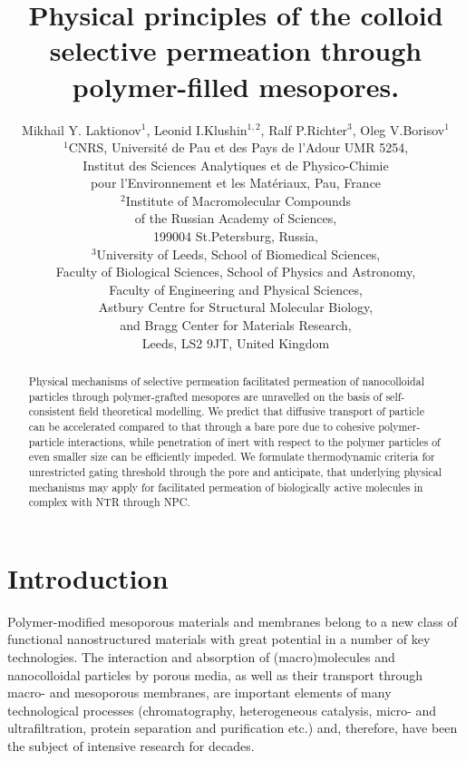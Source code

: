 \documentclass[12pt, a4paper]{article}
\title{Physical principles of the colloid selective permeation through polymer-filled mesopores.}
\author{Mikhail Y. Laktionov$^1$, Leonid I.Klushin$^{1,2}$, Ralf P.Richter$^3$, Oleg V.Borisov$^1$\\
$^{1}$CNRS, Universit\'e de Pau et des Pays de l'Adour UMR 5254,\\
Institut des Sciences Analytiques et de Physico-Chimie\\
pour l'Environnement et les Mat\'eriaux, Pau, France \\
$^{2}$Institute of Macromolecular Compounds \\
of the Russian Academy of Sciences, \\
199004 St.Petersburg, Russia,\\
$^{3}$University of Leeds, School of Biomedical Sciences, \\
Faculty of Biological Sciences, 
School of Physics and Astronomy, \\
Faculty of Engineering and Physical Sciences,\\  
Astbury Centre for Structural Molecular Biology,\\ 
and Bragg Center for Materials Research,\\ 
Leeds, LS2 9JT, United Kingdom}
\begin{document}
\maketitle

\begin{abstract}
Physical mechanisms of selective permeation facilitated permeation of nanocolloidal particles 
through polymer-grafted mesopores are unravelled on the basis of self-consistent field theoretical modelling.
We predict that diffusive transport of particle can be accelerated compared to that through a bare pore due to
cohesive polymer-particle interactions, while penetration of inert with respect to the polymer particles of even smaller size can be 
efficiently impeded. We formulate thermodynamic criteria for unrestricted gating threshold through the pore and anticipate, that underlying
physical mechanisms may apply for facilitated permeation of biologically active molecules in complex with NTR through NPC.   
\end{abstract}

\section{Introduction}

Polymer-modified mesoporous materials and membranes belong to a new class of functional nanostructured materials with great potential in a number of key technologies. 
The interaction and absorption of (macro)molecules and nanocolloidal particles by porous media, as well as their transport through macro- and mesoporous membranes, 
are important elements of many technological processes (chromatography, heterogeneous catalysis, micro- and ultrafiltration, protein separation and purification etc.) 
and, therefore, have been the subject of intensive research for decades. 
\end{document}
